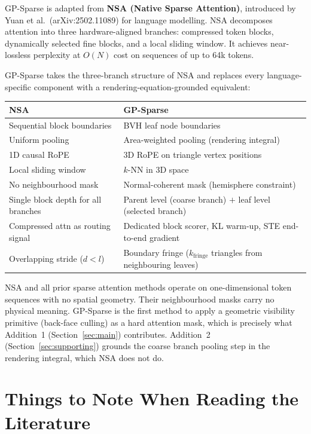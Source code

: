 \documentclass[11pt,letterpaper]{article}
\begin{document}
GP-Sparse is adapted from \textbf{NSA (Native Sparse Attention)},
introduced by Yuan et al.\ (arXiv:2502.11089) for language modelling.
NSA decomposes attention into three hardware-aligned branches:
compressed token blocks, dynamically selected fine blocks, and a local
sliding window.
It achieves near-lossless perplexity at $O(N)$ cost on sequences of up
to 64k tokens.

GP-Sparse takes the three-branch structure of NSA and replaces every
language-specific component with a rendering-equation-grounded equivalent:

\begin{center}\small
\begin{tabular}{@{}ll@{}}
\toprule
NSA & GP-Sparse \\
\midrule
Sequential block boundaries     & BVH leaf node boundaries \\
Uniform pooling                 & Area-weighted pooling (rendering integral) \\
1D causal RoPE                  & 3D RoPE on triangle vertex positions \\
Local sliding window            & $k$-NN in 3D space \\
No neighbourhood mask           & Normal-coherent mask (hemisphere constraint) \\
\midrule
Single block depth for all branches
  & Parent level (coarse branch) $+$ leaf level (selected branch) \\
Compressed attn as routing signal
  & Dedicated block scorer, KL warm-up, STE end-to-end gradient \\
Overlapping stride ($d < l$)
  & Boundary fringe ($k_{\text{fringe}}$ triangles from neighbouring leaves) \\
\bottomrule
\end{tabular}
\end{center}

NSA and all prior sparse attention methods operate on one-dimensional
token sequences with no spatial geometry.
Their neighbourhood masks carry no physical meaning.
GP-Sparse is the first method to apply a geometric visibility primitive
(back-face culling) as a hard attention mask, which is precisely what
Addition~1 (Section~\ref{sec:main}) contributes.
Addition~2 (Section~\ref{sec:supporting}) grounds the coarse branch
pooling step in the rendering integral, which NSA does not do.

\section*{Things to Note When Reading the Literature}
\end{document}

